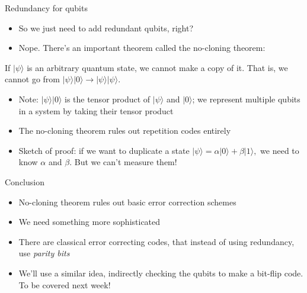 \documentclass[aspectratio=169]{beamer}
\begin{document}
\begin{frame}{Redundancy for qubits}
    \begin{itemize}
        \item So we just need to add redundant qubits, right? \pause
        \item Nope. There's an important theorem called the \textcolor{sigma@mainblue}{no-cloning theorem:} 
    \end{itemize} \pause
    \begin{thrm}
        If $|\psi \rangle$ is an arbitrary quantum state, we cannot make a copy of it. That is, we cannot go from $|\psi \rangle |0\rangle \rightarrow |\psi \rangle |\psi \rangle.$
    \end{thrm}
    \begin{itemize} \pause
    \item Note: $|\psi\rangle |0\rangle$ is the \textcolor{sigma@mainblue}{tensor product} of $|\psi\rangle$ and $|0\rangle$; we represent multiple qubits in a system by taking their tensor product \pause
    \item The no-cloning theorem rules out repetition codes entirely \pause
    \item Sketch of proof: if we want to duplicate a state $|\psi\rangle = \alpha|0\rangle + \beta|1\rangle,$ we need to know $\alpha$ and $\beta$. But we can't measure them!
    \end{itemize}
\end{frame}

\begin{frame}{Conclusion}
    \begin{itemize}
        \item No-cloning theorem rules out basic error correction schemes \pause
        \item We need something more sophisticated \pause
        \item There are classical error correcting codes, that instead of using redundancy, use \textit{parity bits} \pause
        \item We'll use a similar idea, indirectly checking the qubits to make a bit-flip code. To be covered next week!
    \end{itemize}
\end{frame}
\end{document}
